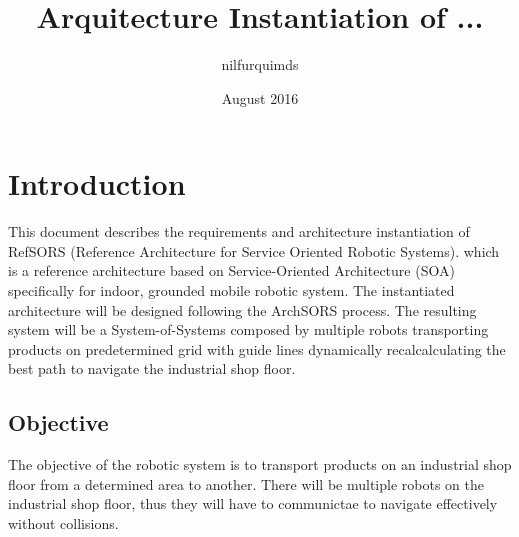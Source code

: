 \documentclass{article}
\title{Arquitecture Instantiation of ...}
\author{nilfurquimds}
\date{August 2016}
\begin{document}
\maketitle

\section*{Introduction}
This document describes the requirements and architecture instantiation of RefSORS (Reference Architecture for Service Oriented Robotic Systems). which is a reference architecture based on Service-Oriented Architecture (SOA) specifically for indoor, grounded mobile robotic system. The instantiated architecture will be designed following the ArchSORS process. The resulting system will be a System-of-Systems composed by multiple robots transporting products on predetermined grid with guide lines dynamically recalcalculating the best path to navigate the industrial shop floor.

\subsection*{Objective}
The objective of the robotic system is to transport products on an industrial shop floor from a determined area to another. There will be multiple robots on the industrial shop floor, thus they will have to communictae to navigate effectively without collisions.




% 
% 



\end{document}
